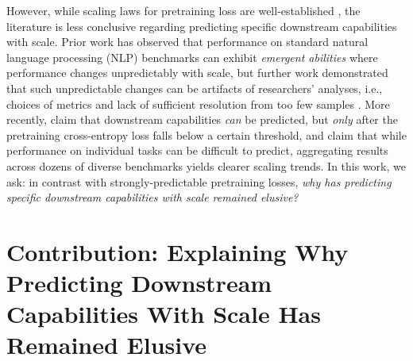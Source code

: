 However, while scaling laws for pretraining loss are well-established \citep{hestness2017deep,rosenfeld2019constructive,henighan2020scaling,kaplan2020scaling,gordon2021data,hernandez2021scaling,jones2021scaling,zhai2022scaling,hoffmann2022training,clark2022unified,neumann2022scaling,hernandez2022scaling,maloney2022solvable,sardana2023chinchillaoptimal,muennighoff2024scaling,besiroglu2024chinchilla}, the literature is less conclusive regarding predicting specific downstream capabilities with scale.
Prior work has observed that performance on standard natural language processing (NLP) benchmarks can exhibit \textit{emergent abilities} \citep{brown2020language,ganguli2022predictability,srivastava2022beyond,wei2022emergent} where performance changes unpredictably with scale, but further work demonstrated that such unpredictable changes can be artifacts of researchers' analyses, i.e., choices of metrics and lack of sufficient resolution from too few samples \citep{srivastava2022beyond,schaeffer2023mirage,hu2024predicting}.
More recently, \citet{du2024understanding} claim that downstream capabilities \textit{can} be predicted, but \textit{only} after the pretraining cross-entropy loss falls below a certain threshold, and \citet{gadre2024language} claim that while performance on individual tasks can be difficult to predict, aggregating results across dozens of diverse benchmarks yields clearer scaling trends. In this work, we ask: in contrast with strongly-predictable pretraining losses, \textit{why has predicting specific downstream capabilities with scale remained elusive?}



\section{Contribution: Explaining Why Predicting Downstream Capabilities With Scale Has Remained Elusive}

